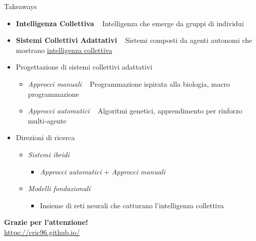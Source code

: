 \documentclass[presentation, 10pt,aspectratio=169]{beamer}\mode<presentation>{\usetheme{AMSBolognaFC}}
\begin{document}
\begin{frame}{Takeaways}
	\begin{itemize}
		\item \textbf{Intelligenza Collettiva} \faArrowRight ~ Intelligenza che emerge da gruppi di individui
		\item \textbf{Sistemi Collettivi Adattativi} \faArrowRight ~ Sistemi composti da agenti autonomi che mostrano \underline{intelligenza collettiva}
		\item Progettazione di sistemi collettivi adattativi
		\begin{itemize}
			\item \emph{Approcci manuali} \faArrowRight ~ Programmazione ispirata alla biologia, macro programmazione
			\item \emph{Approcci automatici} \faArrowRight ~ Algoritmi genetici, apprendimento per rinforzo multi-agente
		\end{itemize}
		\item Direzioni di ricerca
		\begin{itemize}
			\item \emph{Sistemi ibridi}
			\begin{itemize}
				\item \emph{Approcci automatici} + \emph{Approcci manuali}
			\end{itemize}
			\item \emph{Modelli fondazionali}
			\begin{itemize}
				\item Insieme di reti neurali che catturano l'intelligenza collettiva
			\end{itemize}
		\end{itemize}
	\end{itemize}
\end{frame}

{

	
	\begin{frame}[c]
		
		{
		\color{customfg}
	
		\begin{center}
		\Large\textbf{Grazie per l'attenzione!} \\
	
		\large{\url{https://cric96.github.io/}}

		\end{center}
	
		\vspace{1cm}	
	}
\end{frame}
}




\end{document}
